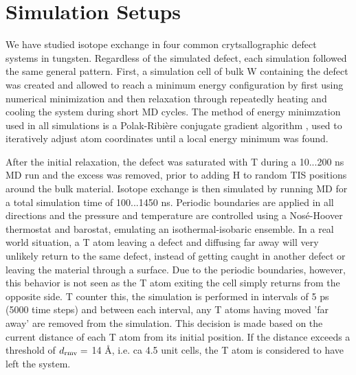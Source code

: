 \chapter{Simulation Setups}
We have studied isotope exchange in four common crytsallographic defect systems in tungsten. Regardless of the simulated defect, each simulation followed the same general pattern. First, a simulation cell of bulk W containing the defect was created and allowed to reach a minimum energy configuration by first using numerical minimization and then relaxation through repeatedly heating and cooling the system during short MD cycles. The method of energy minimzation used in all simulations is a Polak-Ribi\`{e}re conjugate gradient algorithm \cite{polak1969note}, used to iteratively adjust atom coordinates until a local energy minimum was found. 

After the initial relaxation, the defect was saturated with T during a 10...200 ns MD run and the excess was removed, prior to adding H to random TIS positions around the bulk material. Isotope exchange is then simulated by running MD for a total simulation time of 100...1450 ns. Periodic boundaries are applied in all directions and the pressure and temperature are controlled using a Nos\'{e}-Hoover thermostat and barostat, emulating an isothermal-isobaric ensemble. In a real world situation, a T atom leaving a defect and diffusing far away will very unlikely return to the same defect, instead of getting caught in another defect or leaving the material through a surface. Due to the periodic boundaries, however, this behavior is not seen as the T atom exiting the cell simply returns from the opposite side. T counter this, the simulation is performed in intervals of 5 ps (5000 time steps) and between each interval, any T atoms having moved 'far away' are removed from the simulation. This decision is made based on the current distance of each T atom from its initial position. If the distance exceeds a threshold of $d_{\rm{rmv}} =$ 14 \AA, i.e. ca 4.5 unit cells, the T atom is considered to have left the system. 




